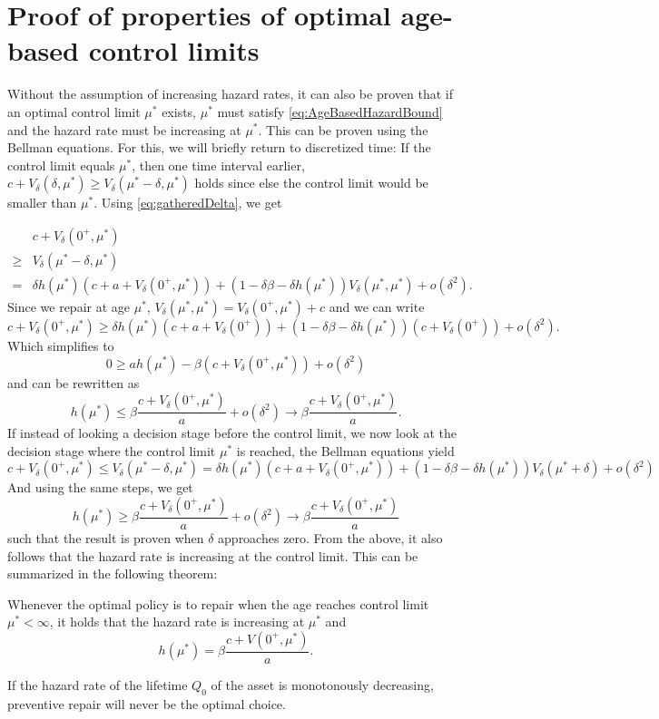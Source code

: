\chapter{Proof of properties of optimal age-based control limits}\label{AppendixAgeBasedControlLimit}
Without the assumption of increasing hazard rates, it can also be proven that if an optimal control limit $\mu^*$ exists, $\mu^*$ must satisfy \eqref{eq:AgeBasedHazardBound} and the hazard rate must be increasing at $\mu^*$.
This can be proven using the Bellman equations.
For this, we will briefly return to discretized time:
If the control limit equals $\mu^*$, then one time interval earlier, $c+V_\delta(\delta,\mu^*)\geq V_\delta(\mu^*-\delta,\mu^*)$ holds since else the control limit would be smaller than $\mu^*$.
Using \eqref{eq:gatheredDelta}, we get

\[\begin{split}
&c+V_\delta(0^+,\mu^*)\\
\geq& V_\delta(\mu^*-\delta,\mu^*)\\
=&\delta h(\mu^*)(c+a+ V_\delta(0^+,\mu^*))+(1-\delta\beta-\delta h(\mu^*)) V_\delta(\mu^*,\mu^*)+o(\delta^2).
\end{split}
\]
Since we repair at age $\mu^*$, $V_\delta(\mu^*,\mu^*)=V_\delta(0^+,\mu^*)+c$ and we can write
$$
c+V_\delta(0^+,\mu^*)\geq \delta h(\mu^*)(c+a+ V_\delta(0^+))+(1-\delta\beta-\delta h(\mu^*)) (c+V_\delta(0^+))+o(\delta^2).
$$
Which simplifies to
$$
0\geq ah(\mu^*)-\beta (c+V_\delta(0^+,\mu^*))+o(\delta^2)
$$
and can be rewritten as
$$
h(\mu^*)\leq \beta\frac{c+V_\delta(0^+,\mu^*)}{a} +o(\delta^2)\rightarrow\beta\frac{c+V_\delta(0^+,\mu^*)}{a}.
$$
If instead of looking a decision stage before the control limit, we now look at the decision stage where the control limit $\mu^*$ is reached, the Bellman equations yield
$$
c+V_\delta(0^+,\mu^*)\leq V_\delta(\mu^*-\delta,\mu^*)=\delta h(\mu^*)(c+a+ V_\delta(0^+,\mu^*))+(1-\delta\beta-\delta h(\mu^*)) V_\delta(\mu^*+\delta)+o(\delta^2)
$$
And using the same steps, we get
$$
h(\mu^*)\geq \beta\frac{c+V_\delta(0^+,\mu^*)}{a} +o(\delta^2)\rightarrow\beta\frac{c+V_\delta(0^+,\mu^*)}{a}
$$
such that the result is proven when $\delta$ approaches zero.
From the above, it also follows that the hazard rate is increasing at the control limit.
This can be summarized in the following theorem:

\begin{theorem}
	Whenever the optimal policy is to repair when the age reaches control limit $\mu^*<\infty$, it holds that the hazard rate is increasing at $\mu^*$ and
	\[h(\mu^*)=\beta\frac{c+V(0^+,\mu^*)}{a}.\]
\end{theorem}

\begin{corollary}
	If the hazard rate of the lifetime $Q_0$ of the asset is monotonously decreasing, preventive repair will never be the optimal choice.
\end{corollary}